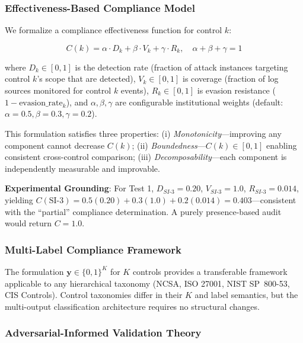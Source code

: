 \documentclass[futureinternet,article,submit,pdftex,moreauthors]{Definitions/mdpi}
\begin{document}
\subsubsection{Effectiveness-Based Compliance Model}

We formalize a compliance effectiveness function for control $k$:
\begin{linenomath}
\begin{equation}
C(k) = \alpha \cdot D_k + \beta \cdot V_k + \gamma \cdot R_k, \quad \alpha + \beta + \gamma = 1
\label{eq:compliance}
\end{equation}
\end{linenomath}
where $D_k \in [0,1]$ is the detection rate (fraction of attack instances targeting control
$k$'s scope that are detected), $V_k \in [0,1]$ is coverage (fraction of log sources
monitored for control $k$ events), $R_k \in [0,1]$ is evasion resistance
($1 - \text{evasion\_rate}_k$), and $\alpha, \beta, \gamma$ are configurable institutional
weights (default: $\alpha = 0.5, \beta = 0.3, \gamma = 0.2$).

This formulation satisfies three properties: (i) \textit{Monotonicity}---improving any
component cannot decrease $C(k)$; (ii) \textit{Boundedness}---$C(k) \in [0,1]$ enabling
consistent cross-control comparison; (iii) \textit{Decomposability}---each component is
independently measurable and improvable.

\textbf{Experimental Grounding}: For Test 1, $D_{SI\text{-}3} = 0.20$, $V_{SI\text{-}3} = 1.0$,
$R_{SI\text{-}3} = 0.014$, yielding
$C(\text{SI-3}) = 0.5(0.20) + 0.3(1.0) + 0.2(0.014) = 0.403$---consistent with the
``partial'' compliance determination. A purely presence-based audit would return $C = 1.0$.

\subsubsection{Multi-Label Compliance Framework}

The formulation $\mathbf{y} \in \{0,1\}^K$ for $K$ controls provides a transferable
framework applicable to any hierarchical taxonomy (NCSA, ISO 27001, NIST SP~800-53, CIS
Controls). Control taxonomies differ in their $K$ and label semantics, but the multi-output
classification architecture requires no structural changes.

\subsubsection{Adversarial-Informed Validation Theory}
\end{document}
